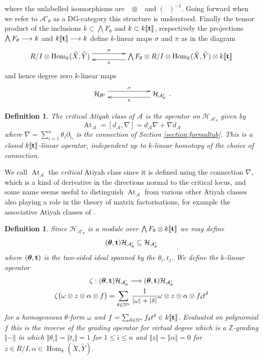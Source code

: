 \documentclass[english,letter paper,12pt,leqno]{article}
\theoremstyle{example}
\newtheorem{definition}[theorem]{Definition}
\numberwithin{equation}{section}
\def\AA{\mathcal{A}}
\def\BB{\mathcal{B}}
\def\HH{\HH}
\def\HH{\mathcal{H}}
\def\Hom{\operatorname{Hom}}
\def\be{\begin{equation}}
\def\ee{\end{equation}}
\def\nZ{\mathds{Z}}
\DeclareMathOperator{\sigmastar}{\sigma_t}
\DeclareMathOperator{\vAt}{At}
\begin{document}
where the unlabelled isomorphisms are $\sigmastar \otimes \sigmastar$ and $(\sigmastar)^{-1}$. Going forward when we refer to $\AA'_\theta$ as a DG-category this structure is understood. Finally the tensor product of the inclusions $k \subset \bigwedge F_\theta$ and $k \subset k\llbracket \bold{t} \rrbracket$, respectively the projections $\bigwedge F_\theta \longrightarrow k$ and $k \llbracket \bold{t} \rrbracket \longrightarrow k$ define $k$-linear maps $\sigma$ and $\pi$ as in the diagram
\[
\xymatrix@C+2pc{
R/I \otimes \Hom_k(\widetilde{X},\widetilde{Y}) \ar@<1ex>[r]^-{\sigma} & \bigwedge F_\theta \otimes R/I \otimes \Hom_k(\widetilde{X},\widetilde{Y}) \otimes k \llbracket \bold{t} \rrbracket\ar@<1ex>[l]^-{\pi}
}
\]
and hence degree zero $k$-linear maps
\[
\xymatrix@C+3pc{
\HH_{\BB'} \ar@<1ex>[r]^-{\sigma} & \HH_{\AA'_\theta}\ar@<1ex>[l]^-{\pi}
}\,.
\]

\begin{definition}\label{defn:atiyah_class} The \emph{critical Atiyah class} of $\AA$ is the operator on $\HH_{\AA'_\theta}$ given by
\[
\vAt_{\AA} = [ d_{\AA}, \nabla ] = d_{\AA} \nabla + \nabla d_{\AA}
\]
where $\nabla = \sum_{i=1}^n \theta_i \partial_{t_i}$ is the connection of Section \ref{section:formaltub}. This is a closed $k\llbracket \bold{t} \rrbracket$-linear operator, independent up to $k$-linear homotopy of the choice of connection.
\end{definition}

We call $\vAt_{\AA}$ the \emph{critical} Atiyah class since it is defined using the connection $\nabla$, which is a kind of derivative in the directions normal to the critical locus, and some name seems useful to distinguish $\vAt_{\AA}$ from various other Atiyah classes also playing a role in the theory of matrix factorisations, for example the associative Atiyah classes of \cite{lgdual}.

\begin{definition}\label{definition:zeta} Since $\HH_{\AA'_\theta}$ is a module over $\bigwedge F_\theta \otimes k\llbracket \bold{t} \rrbracket$ we may define
\be
(\boldsymbol{\theta}, \bold{t}) \HH_{\AA'_\theta} \subseteq \HH_{\AA'_\theta}
\ee
where $(\boldsymbol{\theta}, \bold{t})$ is the two-sided ideal spanned by the $\theta_i, t_j$. We define the $k$-linear operator
\begin{gather*}
\zeta: (\boldsymbol{\theta}, \bold{t}) \HH_{\AA'_\theta} \lto (\boldsymbol{\theta}, \bold{t}) \HH_{\AA'_\theta}\\
\zeta\big( \omega \otimes z \otimes \alpha \otimes f \big) = \sum_{\delta \in \mathbb{N}^n} \frac{1}{|\omega| + |\delta|} \omega \otimes z \otimes \alpha \otimes f_\delta t^\delta
\end{gather*}
for a homogeneous $\theta$-form $\omega$ and $f = \sum_{\delta \in \mathbb{N}^n} f_\delta t^\delta \in k\llbracket \bold{t} \rrbracket$. Evaluated on polynomial $f$ this is the inverse of the grading operator for \emph{virtual degree} which is a $\nZ$-grading $\Vert - \Vert$ in which $\Vert\theta_i\Vert = \Vert t_i \Vert = 1$ for $1 \le i \le n$ and $\Vert z \Vert = \Vert \alpha \Vert = 0$ for $z \in R/I, \alpha \in \Hom_k(\widetilde{X},\widetilde{Y})$.
\end{definition}
\end{document}
